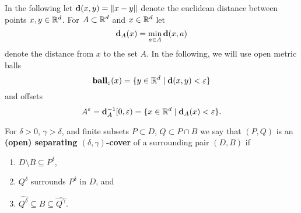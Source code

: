 
In the following let $\mathbf{d}(x, y) = \|x - y\|$ denote the euclidean distance between points $x,y\in \mathbb{R}^d$.
For $A\subset\mathbb{R}^d$ and $x\in \mathbb{R}^d$ let
\[\mathbf{d}_A(x) = \min_{a\in A}\mathbf{d}(x, a)\]
denote the distance from $x$ to the set $A$.
In the following, we will use open metric balls
\[\mathbf{ball}_\varepsilon(x) = \{y\in\mathbb{R}^d\mid \mathbf{d}(x, y) < \varepsilon\}\]
and offsets
\[A^\varepsilon = \mathbf{d}_A^{-1}[0, \varepsilon) = \{x\in \mathbb{R}^d\mid \mathbf{d}_A(x) < \varepsilon\}.\]%


\begin{definition}
  For $\delta > 0$, $\gamma > \delta$, and finite subsets $P\subset D$, $Q\subset P\cap B$ we say that $(P, Q)$ is an \textbf{(open) separating $(\delta,\gamma)$-cover} of a surrounding pair $(D, B)$ if
  \begin{enumerate}[label=(\alph*)]
    \item $D\setminus B \subseteq P^\delta$,
    \item $Q^\delta$ surrounds $P^\delta$ in $D$, and
    \item $\hat{Q^\delta}\subseteq B\subseteq \hat{Q^\gamma}$.
  \end{enumerate}
\end{definition}


